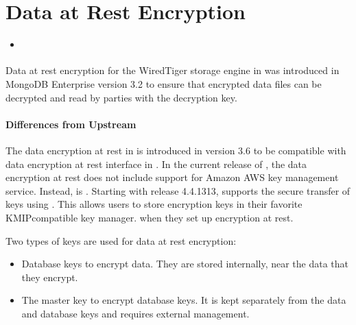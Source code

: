 \documentclass[letterpaper,10pt,english]{sphinxmanual}
\begin{document}
\chapter{Data at Rest Encryption}
\label{\detokenize{data-at-rest-encryption:data-at-rest-encryption}}\label{\detokenize{data-at-rest-encryption:psmdb-data-at-rest-encryption}}\label{\detokenize{data-at-rest-encryption::doc}}
\begin{sphinxShadowBox}
\begin{itemize}
\item {} 
\sphinxAtStartPar
{}\label{\detokenize{data-at-rest-encryption:id1}}{\hyperref[\detokenize{data-at-rest-encryption:encrypting-rollback-files}]{}}

\end{itemize}
\end{sphinxShadowBox}

\sphinxAtStartPar
Data at rest encryption for the WiredTiger storage engine in  was
introduced in MongoDB Enterprise version 3.2 to ensure that encrypted data
files can be decrypted and read by parties with the decryption key.
\subsubsection*{Differences from Upstream}

\sphinxAtStartPar
The data encryption at rest in  is introduced in version 3.6 to be compatible with
data encryption at rest interface in . In the current release of , the data encryption at rest does not include support for Amazon AWS key management service. Instead,  is {\hyperref[\detokenize{vault:vault}]{}}. Starting with release 4.4.13\sphinxhyphen{}13,  supports the secure transfer of keys using {\hyperref[\detokenize{kmip:kmip}]{}}. This allows users to store encryption keys in their favorite KMIP\sphinxhyphen{}compatible key manager. when they set up encryption at rest.

\sphinxAtStartPar
Two types of keys are used for data at rest encryption:
\begin{itemize}
\item {} 
\sphinxAtStartPar
Database keys to encrypt data. They are stored internally, near the data that they encrypt.

\item {} 
\sphinxAtStartPar
The master key to encrypt database keys. It is kept separately from the data and database keys and requires external management.

\end{itemize}
\end{document}
